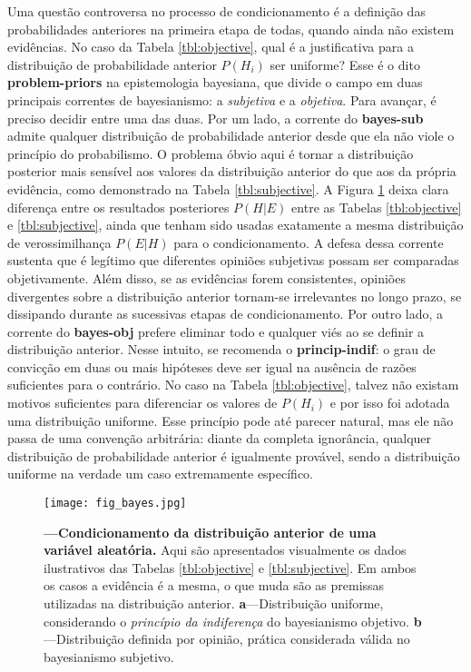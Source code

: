 \documentclass[./main.tex]{subfiles}
\begin{document}
\par Uma questão controversa no processo de condicionamento é a definição das probabilidades anteriores na primeira etapa de todas, quando ainda não existem evidências. No caso da Tabela \ref{tbl:objective}, qual é a justificativa para a distribuição de probabilidade anterior $P(H_i)$ ser uniforme? Esse é o dito \textbf{\gls{problem-priors}} na epistemologia bayesiana, que divide o campo em duas principais correntes de bayesianismo: a \textit{subjetiva} e a \textit{objetiva}. Para avançar, é preciso decidir entre uma das duas. Por um lado, a corrente do \textbf{\gls{bayes-sub}} admite qualquer distribuição de probabilidade anterior desde que ela não viole o princípio do probabilismo. O problema óbvio aqui é tornar a distribuição posterior mais sensível aos valores da distribuição anterior do que aos da própria evidência, como demonstrado na Tabela \ref{tbl:subjective}. A Figura \ref{fig:bayes} deixa clara diferença entre os resultados posteriores $P(H | E)$ entre as Tabelas \ref{tbl:objective} e \ref{tbl:subjective}, ainda que tenham sido usadas exatamente a mesma distribuição de verossimilhança $P(E | H)$ para o condicionamento. A defesa dessa corrente sustenta que é legítimo que diferentes opiniões subjetivas possam ser comparadas objetivamente. Além disso, se as evidências forem consistentes, opiniões divergentes sobre a distribuição anterior tornam-se irrelevantes no longo prazo, se dissipando durante as sucessivas etapas de condicionamento. Por outro lado, a corrente do \textbf{\gls{bayes-obj}} prefere eliminar todo e qualquer viés ao se definir a distribuição anterior. Nesse intuito, se recomenda o \textbf{\gls{princip-indif}}: o grau de convicção em duas ou mais hipóteses deve ser igual na ausência de razões suficientes para o contrário. No caso na Tabela \ref{tbl:objective},  talvez não existam motivos suficientes para diferenciar os valores de $P(H_i)$ e por isso foi adotada uma distribuição uniforme. Esse princípio pode até parecer natural, mas ele não passa de uma convenção arbitrária: diante da completa ignorância, qualquer distribuição de probabilidade anterior é igualmente provável, sendo a distribuição uniforme na verdade um caso extremamente específico.

\begin{figure}[t!] %
	\centering				
	\texttt{[image: fig\_bayes.jpg]}		
	\caption[Exemplo do condicionamento bayesiana]
	{\textbf{---\;Condicionamento da distribuição anterior de uma variável aleatória.}
        Aqui são apresentados visualmente os dados ilustrativos das Tabelas \ref{tbl:objective} e \ref{tbl:subjective}. Em ambos os casos a evidência é a mesma, o que muda são as premissas utilizadas na distribuição anterior. \;\textbf{a}\;---\;Distribuição uniforme, considerando o \textit{princípio da indiferença} do bayesianismo objetivo. \;\textbf{b}\;---\;Distribuição definida por opinião, prática considerada válida no bayesianismo subjetivo.  
	}
\label{fig:bayes}  %
\end{figure}
\end{document}
